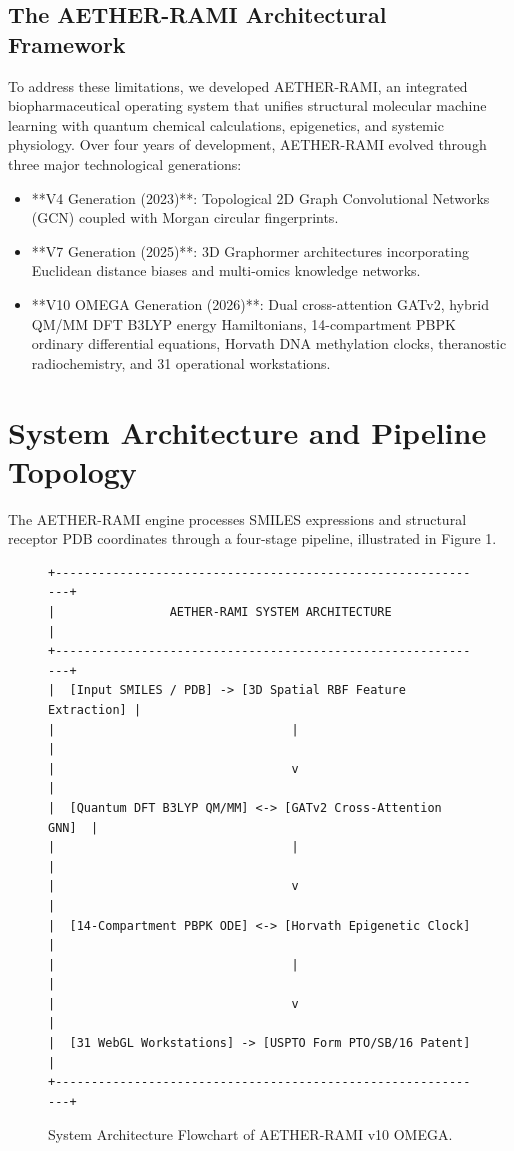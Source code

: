 \documentclass[10pt,journal,compsoc]{IEEEtran}
\begin{document}
\subsection{The AETHER-RAMI Architectural Framework}
To address these limitations, we developed AETHER-RAMI, an integrated biopharmaceutical operating system that unifies structural molecular machine learning with quantum chemical calculations, epigenetics, and systemic physiology. Over four years of development, AETHER-RAMI evolved through three major technological generations:
\begin{itemize}
    \item **V4 Generation (2023)**: Topological 2D Graph Convolutional Networks (GCN) coupled with Morgan circular fingerprints.
    \item **V7 Generation (2025)**: 3D Graphormer architectures incorporating Euclidean distance biases and multi-omics knowledge networks.
    \item **V10 OMEGA Generation (2026)**: Dual cross-attention GATv2, hybrid QM/MM DFT B3LYP energy Hamiltonians, 14-compartment PBPK ordinary differential equations, Horvath DNA methylation clocks, theranostic radiochemistry, and 31 operational workstations.
\end{itemize}

\section{System Architecture and Pipeline Topology}

The AETHER-RAMI engine processes SMILES expressions and structural receptor PDB coordinates through a four-stage pipeline, illustrated in Figure 1.

\begin{figure}[h]
\centering
\begin{verbatim}
+-------------------------------------------------------------+
|                AETHER-RAMI SYSTEM ARCHITECTURE              |
+-------------------------------------------------------------+
|  [Input SMILES / PDB] -> [3D Spatial RBF Feature Extraction] |
|                                 |                           |
|                                 v                           |
|  [Quantum DFT B3LYP QM/MM] <-> [GATv2 Cross-Attention GNN]  |
|                                 |                           |
|                                 v                           |
|  [14-Compartment PBPK ODE] <-> [Horvath Epigenetic Clock]   |
|                                 |                           |
|                                 v                           |
|  [31 WebGL Workstations] -> [USPTO Form PTO/SB/16 Patent]    |
+-------------------------------------------------------------+
\end{verbatim}
\caption{System Architecture Flowchart of AETHER-RAMI v10 OMEGA.}
\label{fig:arch}
\end{figure}
\end{document}

